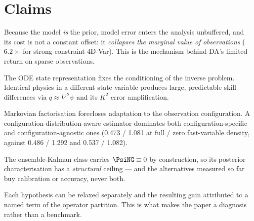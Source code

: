 \section{Claims}
\label{sec:claims}

\begin{description}[leftmargin=2.2em,style=nextline]
  \item[\textbf{C1 (H2, headline).}]
    Because the model \emph{is} the prior, model error enters the analysis
    unbuffered, and its cost is not a constant offset: it \emph{collapses the
    marginal value of observations} ($6.2\times$ for strong-constraint 4D-Var).
    This is the mechanism behind DA's limited return on sparse observations.
  \item[\textbf{C2 (H3a).}]
    The ODE state representation fixes the conditioning of the inverse problem.
    Identical physics in a different state variable produces large, predictable
    skill differences via $q \approx \nabla^2\psi$ and its $K^2$ error
    amplification.
  \item[\textbf{C3 (H1).}]
    Markovian factorisation forecloses adaptation to the observation
    configuration. A configuration-distribution-aware estimator dominates both
    configuration-specific and configuration-agnostic ones (0.473 / 1.081 at
    full / zero fast-variable density, against 0.486 / 1.292 and 0.537 / 1.082).
  \item[\textbf{C4 (H1 $+$ H3a $\Rightarrow$ S-b).}]
    The ensemble-Kalman class carries $\PsiNG \equiv 0$ by construction, so its
    posterior characterisation has a \emph{structural} ceiling --- and the
    alternatives measured so far buy calibration or accuracy, never both.
  \item[\textbf{C5 (attribution).}]
    Each hypothesis can be relaxed separately and the resulting gain attributed
    to a named term of the operator partition. This is what makes the paper a
    diagnosis rather than a benchmark.
  \item[\textbf{C6 (H2 $\times$ H3b).}]

\end{description}
